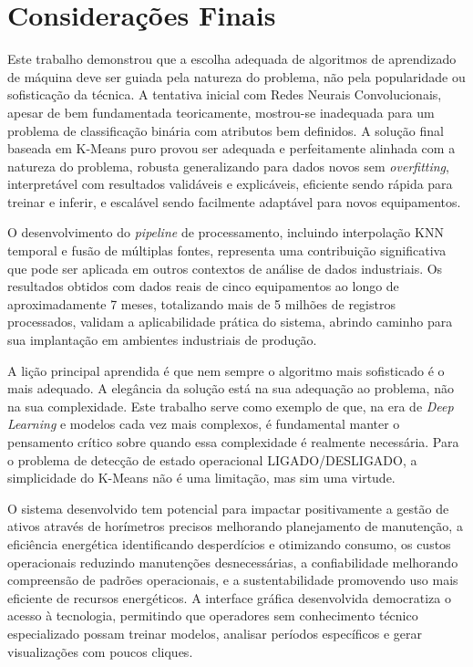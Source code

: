 \section{Considerações Finais}

Este trabalho demonstrou que a escolha adequada de algoritmos de aprendizado de máquina deve ser guiada pela natureza do problema, não pela popularidade ou sofisticação da técnica. A tentativa inicial com Redes Neurais Convolucionais, apesar de bem fundamentada teoricamente, mostrou-se inadequada para um problema de classificação binária com atributos bem definidos. A solução final baseada em K-Means puro provou ser adequada e perfeitamente alinhada com a natureza do problema, robusta generalizando para dados novos sem \textit{overfitting}, interpretável com resultados validáveis e explicáveis, eficiente sendo rápida para treinar e inferir, e escalável sendo facilmente adaptável para novos equipamentos.

O desenvolvimento do \textit{pipeline} de processamento, incluindo interpolação KNN temporal e fusão de múltiplas fontes, representa uma contribuição significativa que pode ser aplicada em outros contextos de análise de dados industriais. Os resultados obtidos com dados reais de cinco equipamentos ao longo de aproximadamente 7 meses, totalizando mais de 5 milhões de registros processados, validam a aplicabilidade prática do sistema, abrindo caminho para sua implantação em ambientes industriais de produção.

A lição principal aprendida é que nem sempre o algoritmo mais sofisticado é o mais adequado. A elegância da solução está na sua adequação ao problema, não na sua complexidade. Este trabalho serve como exemplo de que, na era de \textit{Deep Learning} e modelos cada vez mais complexos, é fundamental manter o pensamento crítico sobre quando essa complexidade é realmente necessária. Para o problema de detecção de estado operacional LIGADO/DESLIGADO, a simplicidade do K-Means não é uma limitação, mas sim uma virtude.

O sistema desenvolvido tem potencial para impactar positivamente a gestão de ativos através de horímetros precisos melhorando planejamento de manutenção, a eficiência energética identificando desperdícios e otimizando consumo, os custos operacionais reduzindo manutenções desnecessárias, a confiabilidade melhorando compreensão de padrões operacionais, e a sustentabilidade promovendo uso mais eficiente de recursos energéticos. A interface gráfica desenvolvida democratiza o acesso à tecnologia, permitindo que operadores sem conhecimento técnico especializado possam treinar modelos, analisar períodos específicos e gerar visualizações com poucos cliques.

